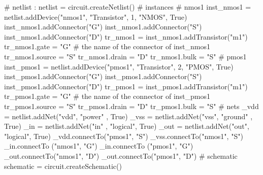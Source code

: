 \begin{DoxyCodeInclude}
\textcolor{comment}{# netlist :}
netlist = circuit.createNetlist()
\textcolor{comment}{#  instances}
\textcolor{comment}{#   nmos1}
inst\_nmos1 = netlist.addDevice(\textcolor{stringliteral}{"nmos1"}, \textcolor{stringliteral}{"Transistor"}, 1, \textcolor{stringliteral}{"NMOS"}, \textcolor{keyword}{True})
inst\_nmos1.addConnector(\textcolor{stringliteral}{"G"})
inst\_nmos1.addConnector(\textcolor{stringliteral}{"S"})
inst\_nmos1.addConnector(\textcolor{stringliteral}{"D"})
tr\_nmos1 = inst\_nmos1.addTransistor(\textcolor{stringliteral}{"m1"})
tr\_nmos1.gate   = \textcolor{stringliteral}{"G"} \textcolor{comment}{# the name of the connector of inst\_nmos1}
tr\_nmos1.source = \textcolor{stringliteral}{"S"}
tr\_nmos1.drain  = \textcolor{stringliteral}{"D"}
tr\_nmos1.bulk   = \textcolor{stringliteral}{"S"}
\textcolor{comment}{#   pmos1}
inst\_pmos1 = netlist.addDevice(\textcolor{stringliteral}{"pmos1"}, \textcolor{stringliteral}{"Transistor"}, 2, \textcolor{stringliteral}{"PMOS"}, \textcolor{keyword}{True})
inst\_pmos1.addConnector(\textcolor{stringliteral}{"G"})
inst\_pmos1.addConnector(\textcolor{stringliteral}{"S"})
inst\_pmos1.addConnector(\textcolor{stringliteral}{"D"})
tr\_pmos1 = inst\_pmos1.addTransistor(\textcolor{stringliteral}{"m1"})
tr\_pmos1.gate   = \textcolor{stringliteral}{"G"} \textcolor{comment}{# the name of the connector of inst\_pmos1}
tr\_pmos1.source = \textcolor{stringliteral}{"S"}
tr\_pmos1.drain  = \textcolor{stringliteral}{"D"}
tr\_pmos1.bulk   = \textcolor{stringliteral}{"S"}
\textcolor{comment}{#  nets}
\_vdd = netlist.addNet(\textcolor{stringliteral}{"vdd"}, \textcolor{stringliteral}{"power"}  , \textcolor{keyword}{True})
\_vss = netlist.addNet(\textcolor{stringliteral}{"vss"}, \textcolor{stringliteral}{"ground"} , \textcolor{keyword}{True})
\_in  = netlist.addNet(\textcolor{stringliteral}{"in"} , \textcolor{stringliteral}{"logical"}, \textcolor{keyword}{True})
\_out = netlist.addNet(\textcolor{stringliteral}{"out"}, \textcolor{stringliteral}{"logical"}, \textcolor{keyword}{True})
\_vdd.connectTo(\textcolor{stringliteral}{"pmos1"}, \textcolor{stringliteral}{"S"})
\_vss.connectTo(\textcolor{stringliteral}{"nmos1"}, \textcolor{stringliteral}{"S"})
\_in.connectTo (\textcolor{stringliteral}{"nmos1"}, \textcolor{stringliteral}{"G"})
\_in.connectTo (\textcolor{stringliteral}{"pmos1"}, \textcolor{stringliteral}{"G"})
\_out.connectTo(\textcolor{stringliteral}{"nmos1"}, \textcolor{stringliteral}{"D"})
\_out.connectTo(\textcolor{stringliteral}{"pmos1"}, \textcolor{stringliteral}{"D"})
\textcolor{comment}{# schematic}
schematic = circuit.createSchematic()

\end{DoxyCodeInclude}
